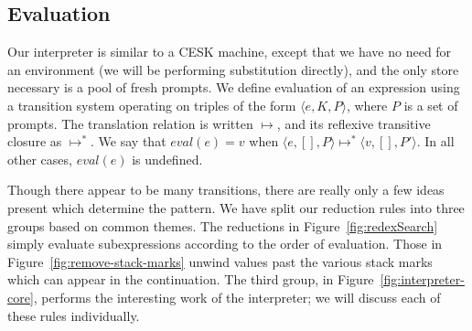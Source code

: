 \documentclass[11pt]{article}
\newcommand{\maybePage}{\null}
\newcommand{\tuple}[1]{\langle{}{#1}\rangle{}}
\newcommand{\angles}[1]{\langle#1\rangle}
\begin{document}
\maybePage
\subsection{Evaluation}

Our interpreter is similar to a CESK machine, except that we have no need for an environment (we will be performing substitution directly), and the only store necessary is a pool of fresh prompts.
We define evaluation of an expression using a transition system operating on triples of the form $\angles{e,K,P}$, where $P$ is a set of prompts.
The translation relation is written $\longmapsto$, and its reflexive transitive closure as $\longmapsto^*$.
We say that $eval(e) = v$ when $\angles{e,[],P} \longmapsto^* \tuple{v,[],P'}$.
In all other cases, $eval(e)$ is undefined.

Though there appear to be many transitions, there are really only a few ideas present which determine the pattern.
We have split our reduction rules into three groups based on common themes.
The reductions in Figure~\ref{fig:redexSearch} simply evaluate subexpressions according to the order of evaluation.
Those in Figure~\ref{fig:remove-stack-marks} unwind values past the various stack marks which can appear in the continuation.
The third group, in Figure~\ref{fig:interpreter-core}, performs the interesting work of the interpreter;
we will discuss each of these rules individually.
\end{document}
